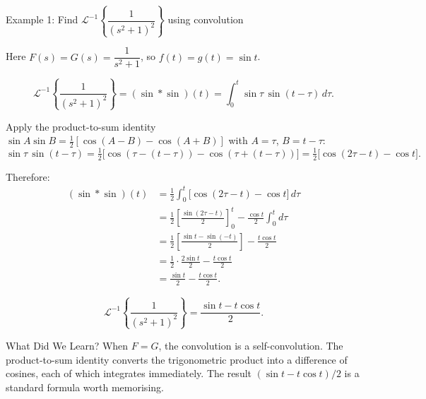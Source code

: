 \documentclass[12pt,a4paper]{article}
\begin{document}
\begin{infobox}{Example 1: Find $\mathcal{L}^{-1}\!\left\{\dfrac{1}{(s^2+1)^2}\right\}$ using convolution}

Here $F(s) = G(s) = \dfrac{1}{s^2+1}$, so $f(t) = g(t) = \sin t$.

\[
  \mathcal{L}^{-1}\!\left\{\frac{1}{(s^2+1)^2}\right\}
    = (\sin * \sin)(t)
    = \int_0^t \sin\tau\,\sin(t-\tau)\,d\tau.
\]

Apply the product-to-sum identity
$\sin A\sin B = \tfrac{1}{2}[\cos(A-B)-\cos(A+B)]$ with $A=\tau$, $B=t-\tau$:
\[
  \sin\tau\,\sin(t-\tau)
    = \tfrac{1}{2}\bigl[\cos(\tau-(t-\tau)) - \cos(\tau+(t-\tau))\bigr]
    = \tfrac{1}{2}\bigl[\cos(2\tau-t) - \cos t\bigr].
\]

Therefore:
\begin{align*}
(\sin*\sin)(t)
  &= \frac{1}{2}\int_0^t \bigl[\cos(2\tau-t) - \cos t\bigr]\,d\tau \\
  &= \frac{1}{2}\left[\frac{\sin(2\tau-t)}{2}\right]_0^t
     - \frac{\cos t}{2}\int_0^t d\tau \\
  &= \frac{1}{2}\left[\frac{\sin t - \sin(-t)}{2}\right]
     - \frac{t\cos t}{2} \\
  &= \frac{1}{2}\cdot\frac{2\sin t}{2} - \frac{t\cos t}{2} \\
  &= \frac{\sin t}{2} - \frac{t\cos t}{2}.
\end{align*}

\[
  \boxed{\mathcal{L}^{-1}\!\left\{\frac{1}{(s^2+1)^2}\right\}
    = \frac{\sin t - t\cos t}{2}.}
\]
\end{infobox}

\begin{learnbox}{What Did We Learn?}
When $F = G$, the convolution is a self-convolution. The product-to-sum identity
converts the trigonometric product into a difference of cosines, each of which
integrates immediately. The result $(\sin t - t\cos t)/2$ is a standard formula
worth memorising.
\end{learnbox}

\medskip
\end{document}
